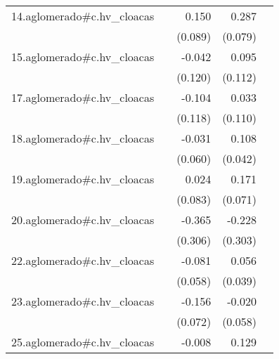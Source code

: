 {\begin{longtable}{l*{4}{D{.}{.}{-1}}}
\addlinespace
14.aglomerado#c.hv\_cloacas&                     &       0.150         &       0.287\sym{***}&                     \\
            &                     &     (0.089)         &     (0.079)         &                     \\
\addlinespace
15.aglomerado#c.hv\_cloacas&                     &      -0.042         &       0.095         &                     \\
            &                     &     (0.120)         &     (0.112)         &                     \\
\addlinespace
17.aglomerado#c.hv\_cloacas&                     &      -0.104         &       0.033         &                     \\
            &                     &     (0.118)         &     (0.110)         &                     \\
\addlinespace
18.aglomerado#c.hv\_cloacas&                     &      -0.031         &       0.108\sym{**} &                     \\
            &                     &     (0.060)         &     (0.042)         &                     \\
\addlinespace
19.aglomerado#c.hv\_cloacas&                     &       0.024         &       0.171\sym{*}  &                     \\
            &                     &     (0.083)         &     (0.071)         &                     \\
\addlinespace
20.aglomerado#c.hv\_cloacas&                     &      -0.365         &      -0.228         &                     \\
            &                     &     (0.306)         &     (0.303)         &                     \\
\addlinespace
22.aglomerado#c.hv\_cloacas&                     &      -0.081         &       0.056         &                     \\
            &                     &     (0.058)         &     (0.039)         &                     \\
\addlinespace
23.aglomerado#c.hv\_cloacas&                     &      -0.156\sym{*}  &      -0.020         &                     \\
            &                     &     (0.072)         &     (0.058)         &                     \\
\addlinespace
25.aglomerado#c.hv\_cloacas&                     &      -0.008         &       0.129         &                     \\

\end{longtable}}
